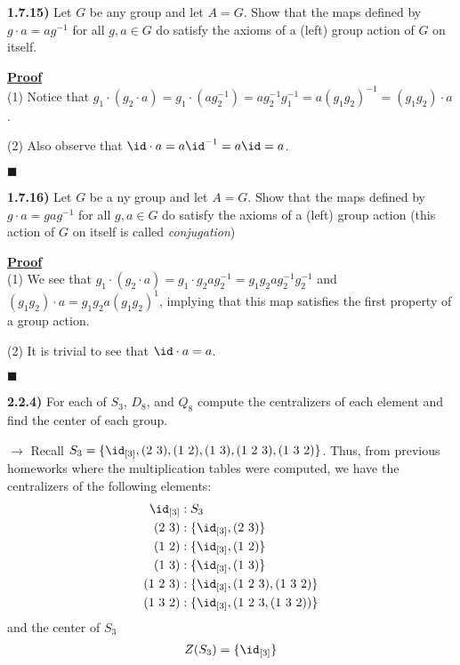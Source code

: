 \documentclass[12pt,a4paper]{article}
\newcommand{\prob}[2]{\textbf{#1)} #2}
\newenvironment{proof}
{
\textbf{\underline{Proof}} \\
}
{
\begin{flushright}
$\blacksquare$
\end{flushright}}
\begin{document}
\prob{1.7.15}{Let $G$ be any group and let $A = G$. Show that the maps defined by $g \cdot a = ag^{-1}$ for all $g,a \in G$ do satisfy the axioms of a (left) group action of $G$ on itself.}

\begin{proof}
(1) Notice that $g_1 \cdot (g_2 \cdot a) = g_1 \cdot (ag_2^{-1}) = ag_2^{-1}g_1^{-1} = a(g_1g_2)^{-1} = (g_1g_2) \cdot a$.

(2) Also observe that $\id \cdot a = a\id^{-1} = a\id = a$.
\end{proof}

\prob{1.7.16}{Let $G$ be a ny group and let $A = G$. Show that the maps defined by $g \cdot a = gag^{-1}$ for all $g,a \in G$ do satisfy the axioms of a (left) group action (this action of $G$ on itself is called \textit{conjugation})}

\begin{proof}
(1) We see that $g_1 \cdot (g_2 \cdot a) = g_1 \cdot g_2ag_2^{-1} = g_1g_2ag_2^{-1}g_2^{-1}$ and $(g_1g_2) \cdot a = g_1g_2a(g_1g_2)^{1}$, implying that this map satisfies the first property of a group action.

(2) It is trivial to see that $\id \cdot a = a$.
\end{proof}

\prob{2.2.4}{For each of $S_3$, $D_8$, and $Q_8$ compute the centralizers of each element and find the center of each group.}

$\rightarrow$ Recall $S_3 = \{\id_{[3]},(2~3),(1~2),(1~3),(1~2~3),(1~3~2)\}$.
Thus, from previous homeworks where the multiplication tables were computed, we have the centralizers of the following elements:
\begin{align*}
\id_{[3]}&: S_3 \\
(2~3)&: \{\id_{[3]},(2~3)\} \\
(1~2)&: \{\id_{[3]},(1~2)\} \\
(1~3)&: \{\id_{[3]},(1~3)\} \\
(1~2~3)&: \{\id_{[3]},(1~2~3),(1~3~2)\} \\
(1~3~2)&: \{\id_{[3]},(1~2~3,(1~3~2))\}
\end{align*}
and the center of $S_3$
\begin{align*}
Z(S_3) = \{\id_{[3]}\}
\end{align*}
\end{document}
